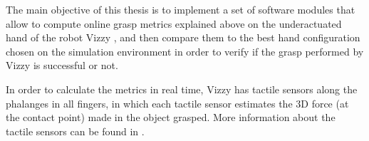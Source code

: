 \par
The main objective of this thesis is to implement a set of software modules that allow to compute online grasp metrics explained above on the underactuated hand of the robot Vizzy \cite{moreno2016vizzy}, and then compare them to the best hand configuration chosen on the simulation environment in order to verify if the grasp performed by Vizzy is successful or not.
\par
In order to calculate the metrics in real time, Vizzy has tactile sensors along the phalanges in all fingers, in which each tactile sensor estimates the 3D force (at the contact point) made in the object grasped. More information about the tactile sensors can be found in \cite{paulino2017low}.
